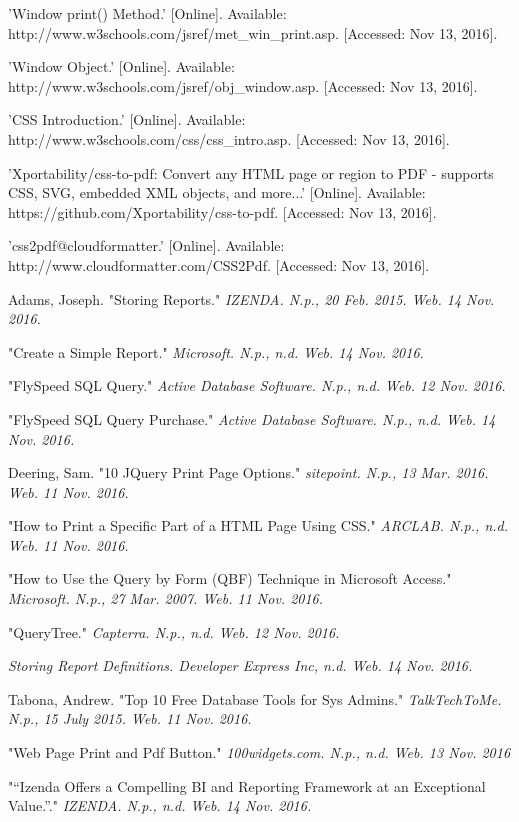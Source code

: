 \documentclass[letterpaper,10pt,serif, draftclsnofoot,onecolumn, compsoc, titlepage]{IEEEtran}
\begin{document}
\begin{thebibliography}{2}
'Window print() Method.' [Online]. Available: http://www.w3schools.com/jsref/met\_win\_print.asp. [Accessed: Nov 13, 2016].

'Window Object.'  [Online]. Available: http://www.w3schools.com/jsref/obj\_window.asp. [Accessed: Nov 13, 2016].

'CSS Introduction.' [Online]. Available: http://www.w3schools.com/css/css\_intro.asp. [Accessed: Nov 13, 2016].

'Xportability/css-to-pdf: Convert any HTML page or region to PDF - supports CSS, SVG, embedded XML objects, and more...' [Online]. Available: https://github.com/Xportability/css-to-pdf. [Accessed: Nov 13, 2016].

'css2pdf@cloudformatter.' [Online]. Available: http://www.cloudformatter.com/CSS2Pdf. [Accessed: Nov 13, 2016].


Adams, Joseph. "Storing Reports." \em{IZENDA}. N.p., 20 Feb. 2015. Web. 14 Nov. 2016.

 "Create a Simple Report." \em{Microsoft}. N.p., n.d. Web. 14 Nov. 2016.

"FlySpeed SQL Query." \em{Active Database Software}. N.p., n.d. Web. 12 Nov. 2016.

"FlySpeed SQL Query Purchase." \em{Active Database Software}. N.p., n.d. Web. 14 Nov. 2016.

 Deering, Sam. "10 JQuery Print Page Options." \em{sitepoint}. N.p., 13 Mar. 2016. Web. 11 Nov. 2016. 

"How to Print a Specific Part of a HTML Page Using CSS." \em{ARCLAB}. N.p., n.d. Web. 11 Nov. 2016. 

"How to Use the Query by Form (QBF) Technique in Microsoft Access." \em{Microsoft}. N.p., 27 Mar. 2007. Web. 11 Nov. 2016.

"QueryTree." \em{Capterra}. N.p., n.d. Web. 12 Nov. 2016.

\em{Storing Report Definitions}. Developer Express Inc, n.d. Web. 14 Nov. 2016.

Tabona, Andrew. "Top 10 Free Database Tools for Sys Admins." \em{TalkTechToMe}. N.p., 15 July 2015. Web. 11 Nov. 2016. 

"Web Page Print and Pdf Button." \em{100widgets.com}. N.p., n.d. Web. 13 Nov. 2016

"“Izenda Offers a Compelling BI and Reporting Framework at an Exceptional Value.”." \em{IZENDA}. N.p., n.d. Web. 14 Nov. 2016.
\end{thebibliography}
\end{document}

